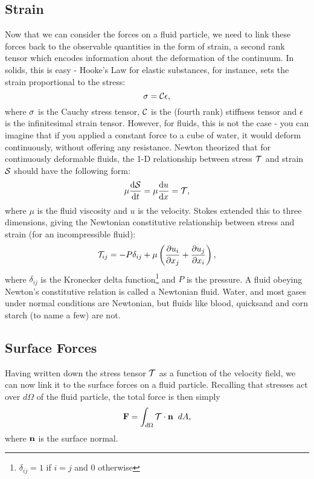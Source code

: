 \subsection{Strain}
Now that we can consider the forces on a fluid particle, we need to link these forces back to the observable quantities in the form of strain, a second rank tensor which encodes information about the deformation of the continuum. In solids, this is easy - Hooke's Law for elastic substances, for instance, sets the strain proportional to the stress:
\begin{equation}
\mathbf{\sigma} = \mathcal{C}\mathbf{\epsilon},
\end{equation}
where $\mathbf{\sigma}$ is the Cauchy stress tensor, $\mathcal{C}$ is the (fourth rank) stiffness tensor and $\mathbf{\epsilon}$ is the infinitesimal strain tensor. However, for fluids, this is not the case - you can imagine that if you applied a constant force to a cube of water, it would deform continuously, without offering any resistance. Newton theorized that for continuously deformable fluids, the 1-D relationship between stress $\mathcal{T}$ and strain $\mathcal{S}$ should have the following form:
\begin{equation}
\mu \der{1}{\Tensor{S}}{t} = \mu \der{1}{u}{x}=\Tensor{T}, 
\end{equation}
where $\mu$ is the fluid viscosity and $u$ is the velocity.  Stokes extended this to three dimensions, giving the Newtonian constitutive relationship between stress and strain (for an incompressible fluid):
\begin{equation}\label{eq:constitutive}
\Tensor{T}_{ij} = -P\delta_{ij} + \mu\paren{\pder{1}{u_{i}}{x_j} + \pder{1}{u_j}{x_i}},
\end{equation}
where $\delta_{ij}$ is the Kronecker delta function\footnote{$\delta_{ij} = 1$ if $i=j$ and $0$ otherwise} and $P$ is the pressure. A fluid obeying Newton's constitutive relation is called a Newtonian fluid. Water, and most gases under normal conditions are Newtonian, but fluids like blood, quicksand and corn starch (to name a few) are not. 

\subsection{Surface Forces}
Having written down the stress tensor $\mathcal{T}$ as a function of the velocity field, we can now link it to the surface forces on a fluid particle. Recalling that stresses act over $d\Omega$ of the fluid particle, the total force is then simply 
\begin{equation}\label{eq:surfaceForce}
\Vector{F} = \int{d\Omega}{}{\Tensor{T}\cdot\Vector{n}}{dA},
\end{equation}
where $\mathbf{n}$ is the surface normal. 
